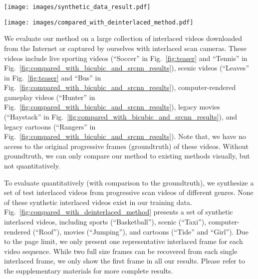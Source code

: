 \begin{figure*}[!tp]
	\centering
	\texttt{[image: images/synthetic\_data\_result.pdf]}\\
	\caption{Comparisons between bicubic interpolation, SRCNN~\cite{dong2016image} and our method. 
	}\label{fig:compared_with_bicubic_and_srcnn_results}
\end{figure*}

\begin{figure*}[!tp]
	\centering
	\texttt{[image: images/compared\_with\_deinterlaced\_method.pdf]}\\
	\caption{Comparisons between the state-of-the-art deinterlacing tailored methods, including ELA~\cite{doyle1990interlaced}, WLSD~\cite{wang2014interlacing}, and FBA~\cite{vedadi2013interlacing}, with our method. }\label{fig:compared_with_deinterlaced_method}
\end{figure*}

We evaluate our method on a large collection of interlaced videos downloaded
from the Internet or captured by ourselves with interlaced scan cameras. These
videos include live sporting videos (``Soccer'' in
Fig.~\ref{fig:teaser} and ``Tennis'' in
Fig.~\ref{fig:compared_with_bicubic_and_srcnn_results}), scenic videos
(``Leaves'' in Fig.~\ref{fig:teaser} and ``Bus'' in
Fig.~\ref{fig:compared_with_bicubic_and_srcnn_results}), computer-rendered gameplay
videos (``Hunter'' in Fig.~\ref{fig:compared_with_bicubic_and_srcnn_results}),
legacy movies (``Haystack'' in
Fig.~\ref{fig:compared_with_bicubic_and_srcnn_results}), and legacy cartoons
(``Rangers'' in Fig.~\ref{fig:compared_with_bicubic_and_srcnn_results}).
Note that, we have no access to the original progressive frames (groundtruth) of 
these videos. Without groundtruth, we can only
compare our method to existing methods visually, but not quantitatively.

To evaluate quantitatively (with comparison to the groundtruth), we 
synthesize a set of test interlaced videos from progressive scan videos of different
genres. None of these synthetic interlaced videos exist in our training data.
Fig.~\ref{fig:compared_with_deinterlaced_method} presents a set of synthetic interlaced 
videos, including sports (``Basketball''), scenic
(``Taxi''), computer-rendered (``Roof''), movies (``Jumping''), and
cartoons (``Tide'' and ``Girl''). Due to the page limit, we only present one
representative interlaced frame for each video sequence. While two full size
frames can be recovered from each single interlaced frame, we only show the
first frame in all our results. Please refer to the supplementary materials for
more complete results.

